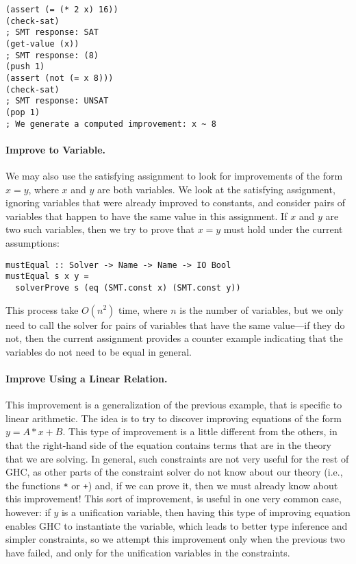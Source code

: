 \documentclass{sigplanconf}
\begin{document}
\break

\begin{Verbatim}
(assert (= (* 2 x) 16))
(check-sat)
; SMT response: SAT
(get-value (x))
; SMT response: (8)
(push 1)
(assert (not (= x 8)))
(check-sat)
; SMT response: UNSAT
(pop 1)
; We generate a computed improvement: x ~ 8
\end{Verbatim}

\paragraph{Improve to Variable.}
We may also use the satisfying assignment to look for improvements of
the form $x = y$, where $x$ and $y$ are both variables.
We look at the satisfying assignment, ignoring variables
that were already improved to constants, and consider pairs of variables
that happen to have the same value in this assignment. If $x$ and $y$
are two such variables, then we try to prove that $x = y$ must hold
under the current assumptions:
\begin{Verbatim}
mustEqual :: Solver -> Name -> Name -> IO Bool
mustEqual s x y =
  solverProve s (eq (SMT.const x) (SMT.const y))
\end{Verbatim}
This process take $O(n^2)$ time, where $n$ is the number of variables,
but we only need to call the solver for pairs of variables that have the same
value---if they do not, then the current assignment provides a counter
example indicating that the variables do not need to be equal in general.

\paragraph{Improve Using a Linear Relation.}
This improvement is a generalization of the previous example, that
is specific to linear arithmetic.  The idea is to try to discover
improving equations of the form $y = A * x + B$.  This type of
improvement is a little different from the others, in that the right-hand
side of the equation contains terms that are in the theory that we are solving.
In general, such constraints are not very useful for the rest of GHC,
as other parts of the constraint solver do not know about our theory
(i.e., the functions \Verb"*" or \Verb"+") and, if we can prove it, then
we must already know about this improvement!  This sort of improvement, is
useful in one very common case, however:  if $y$ is a unification variable,
then having this type of improving equation enables GHC to instantiate
the variable, which leads to better type inference and simpler constraints,
so we attempt this improvement only when the previous two have failed,
and only for the unification variables in the constraints.
\end{document}
